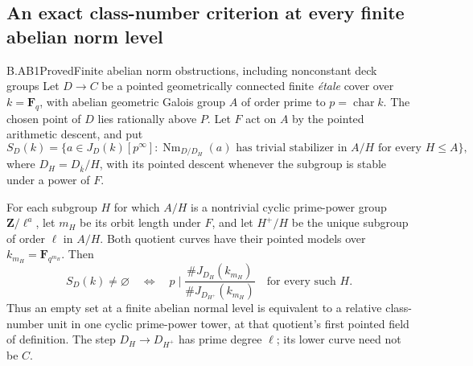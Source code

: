 \subsection{An exact class-number criterion at every finite abelian norm level}

\begin{claim}{B.AB1}{Proved}{Finite abelian norm obstructions, including nonconstant deck groups}
Let $D\to C$ be a pointed geometrically connected finite
\emph{\'etale} cover over $k=\mathbf F_q$, with abelian geometric
Galois group $A$ of order prime to $p=\operatorname{char}k$.
The chosen point of $D$ lies rationally above $P$.
Let $F$ act on $A$ by the pointed arithmetic descent, and put
\[
 S_D(k)=\{a\in J_D(k)[p^\infty]:
    \operatorname{Nm}_{D/D_H}(a)
    \text{ has trivial stabilizer in }A/H
                   \text{ for every }H\le A\},                 \tag{B.AB.1}
\]
where $D_H=D_{\overline k}/H$, with its pointed descent whenever
the subgroup is stable under a power of $F$.

For each subgroup $H$ for which $A/H$ is a nontrivial cyclic
prime-power group $\mathbf Z/\ell^a$, let $m_H$ be its orbit
length under $F$, and let $H^+/H$ be the unique subgroup of
order $\ell$ in $A/H$. Both quotient curves have their pointed
models over $k_{m_H}=\mathbf F_{q^{m_H}}$. Then
\[
 S_D(k)\ne\varnothing
 \quad\Longleftrightarrow\quad
 p\mid
 \frac{\#J_{D_H}(k_{m_H})}{\#J_{D_{H^+}}(k_{m_H})}
 \quad\text{for every such }H.                                \tag{B.AB.2}
\]
Thus an empty set at a finite abelian normal level is equivalent
to a relative class-number unit in one cyclic prime-power tower,
at that quotient's first pointed field of definition. The step
$D_H\to D_{H^+}$ has prime degree $\ell$; its lower curve need
not be $C$.
\end{claim}
